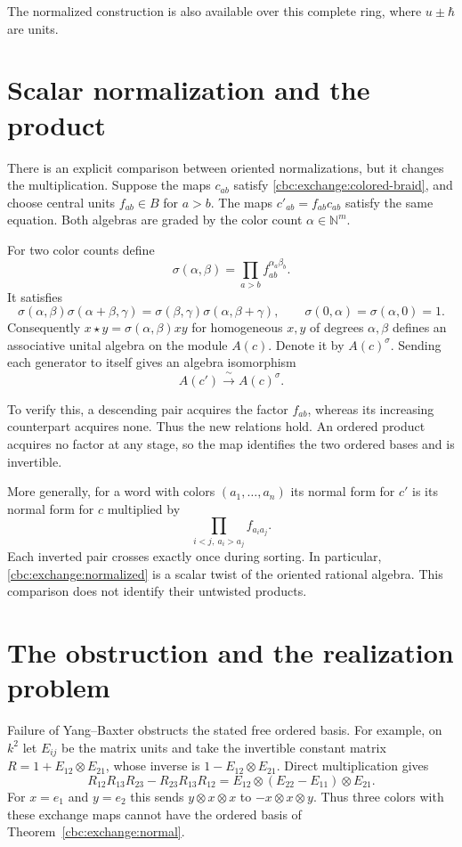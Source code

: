The normalized construction is also available over this complete ring,
where $u\pm\hbar$ are units.

\section{Scalar normalization and the product}
There is an explicit comparison between oriented normalizations, but it
changes the multiplication.  Suppose the maps $c_{ab}$ satisfy
\eqref{cbc:exchange:colored-braid}, and choose central units $f_{ab}\in B$
for $a>b$.  The maps $c'_{ab}=f_{ab}c_{ab}$ satisfy the same equation.
Both algebras are graded by the color count $\alpha\in\mathbb N^m$.

For two color counts define
\[
 \sigma(\alpha,\beta)=\prod_{a>b}f_{ab}^{\alpha_a\beta_b}.
\]
It satisfies
\[
 \sigma(\alpha,\beta)\sigma(\alpha+\beta,\gamma)
 =\sigma(\beta,\gamma)\sigma(\alpha,\beta+\gamma),
 \qquad \sigma(0,\alpha)=\sigma(\alpha,0)=1.
\]
Consequently $x\star y=\sigma(\alpha,\beta)xy$ for homogeneous $x,y$
of degrees $\alpha,\beta$ defines an associative unital algebra on the
module $A(c)$.  Denote it by $A(c)^\sigma$.
Sending each generator to itself gives an algebra isomorphism
\begin{equation}\label{cbc:exchange:twist}
 A(c')\xrightarrow{\ \sim\ }A(c)^\sigma.
\end{equation}

To verify this, a descending pair acquires the factor $f_{ab}$,
whereas its increasing counterpart acquires none.  Thus the new relations
hold.  An ordered product acquires no factor at any stage, so the map
identifies the two ordered bases and is invertible.

More generally, for a word with colors $(a_1,\ldots,a_n)$ its normal
form for $c'$ is its normal form for $c$ multiplied by
\[
 \prod_{i<j,\ a_i>a_j}f_{a_i a_j}.
\]
Each inverted pair crosses exactly once during sorting.
In particular, \eqref{cbc:exchange:normalized} is a scalar twist of the
oriented rational algebra.  This comparison does not identify their
untwisted products.

\section{The obstruction and the realization problem}
Failure of Yang--Baxter obstructs the stated free ordered basis.
For example, on $k^2$ let $E_{ij}$ be the matrix units and take the
invertible constant matrix $R=1+E_{12}\otimes E_{21}$, whose inverse is
$1-E_{12}\otimes E_{21}$.  Direct multiplication gives
\[
 R_{12}R_{13}R_{23}-R_{23}R_{13}R_{12}
 =E_{12}\otimes(E_{22}-E_{11})\otimes E_{21}.
\]
For $x=e_1$ and $y=e_2$ this sends $y\otimes x\otimes x$ to
$-x\otimes x\otimes y$.  Thus three colors with these exchange maps
cannot have the ordered basis of Theorem~\ref{cbc:exchange:normal}.


